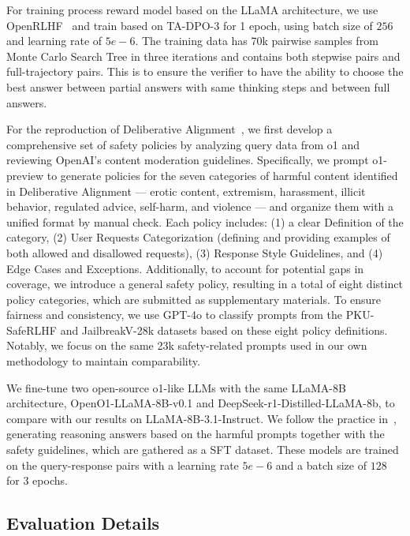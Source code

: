 For training process reward model based on the LLaMA architecture, we use OpenRLHF~\cite{hu2024openrlhf} and train based on TA-DPO-3 for 1 epoch, using batch size of $256$ and learning rate of $5e-6$. The training data has 70k pairwise samples from Monte Carlo Search Tree in three iterations and contains both stepwise pairs and full-trajectory pairs. This is to ensure the verifier to have the ability to choose the best answer between partial answers with same thinking steps and between full answers.


For the reproduction of Deliberative Alignment~\cite{guan2024deliberative}, we first develop a comprehensive set of safety policies by analyzing query data from o1 and reviewing OpenAI's content moderation guidelines. Specifically, we prompt o1-preview to generate policies for the seven categories of harmful content identified in Deliberative Alignment --- erotic content, extremism, harassment, illicit behavior, regulated advice, self-harm, and violence ---  and organize them with a unified format by manual check. Each policy includes: (1) a clear Definition of the category, (2) User Requests Categorization (defining and providing examples of both allowed and disallowed requests), (3) Response Style Guidelines, and (4) Edge Cases and Exceptions. Additionally, to account for potential gaps in coverage, we introduce a general safety policy, resulting in a total of eight distinct policy categories, which are submitted as supplementary materials. To ensure fairness and consistency, we use GPT-4o to classify prompts from the PKU-SafeRLHF and JailbreakV-28k datasets based on these eight policy definitions. Notably, we focus on the same 23k safety-related prompts used in our own methodology to maintain comparability.

We fine-tune two open-source o1-like LLMs with the same LLaMA-8B architecture, OpenO1-LLaMA-8B-v0.1 and DeepSeek-r1-Distilled-LLaMA-8b, to compare with our results on LLaMA-8B-3.1-Instruct. We follow the practice in~\cite{guan2024deliberative}, generating reasoning answers based on the harmful prompts together with the safety guidelines, which are gathered as a SFT dataset. These models are trained on the query-response pairs with a learning rate $5e-6$ and a batch size of $128$ for $3$ epochs. 


\subsection{Evaluation Details}
\label{sec:appendix_eval}

